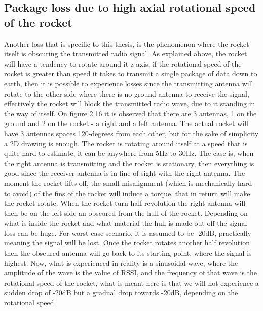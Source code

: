 \subsection{Package loss due to high axial rotational speed of the rocket}
Another loss that is specific to this thesis, is the phenomenon where the rocket itself is obscuring the transmitted radio signal. As explained above, the rocket will have a tendency to rotate around it z-axis, if the rotational speed of the rocket is greater than speed it takes to transmit a single package of data down to earth, then it is possible to experience losses since the transmitting antenna will rotate to the other side where there is no ground antenna to receive the signal, effectively the rocket will block the transmitted radio wave, due to it standing in the way of itself. On figure 2.16 it is observed that there are 3 antennas, 1 on the ground and 2 on the rocket - a right and a left antenna. The actual rocket will have 3 antennas spaces 120-degrees from each other, but for the sake of simplicity a 2D drawing is enough. The rocket is rotating around itself at a speed that is quite hard to estimate, it can be anywhere from 5Hz to 30Hz. The case is, when the right antenna is transmitting and the rocket is stationary, then everything is good since the receiver antenna is in line-of-sight with the right antenna. The moment the rocket lifts off, the small misalignment (which is mechanically hard to avoid) of the fins of the rocket will induce a torque, that in return will make the rocket rotate. When the rocket turn half revolution the right antenna will then be on the left side an obscured from the hull of the rocket. Depending on what is inside the rocket and what material the hull is made out off the signal loss can be huge. For worst-case scenario, it is assumed to be -20dB, practically meaning the signal will be lost. Once the rocket rotates another half revolution then the obscured antenna will go back to its starting point, where the signal is highest. Now, what is experienced in reality is a sinusoidal wave, where the amplitude of the wave is the value of RSSI, and the frequency of that wave is the rotational speed of the rocket, what is meant here is that we will not experience a sudden drop of -20dB but a gradual drop towards -20dB, depending on the rotational speed. 

